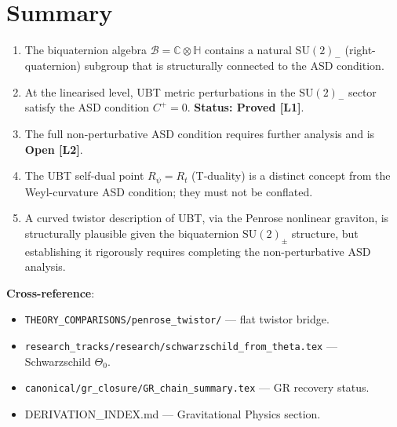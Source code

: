 \documentclass[11pt,a4paper]{article}
\theoremstyle{definition}
\theoremstyle{remark}
\begin{document}
\section{Summary}
\label{sec:summary}

\begin{tcolorbox}[colback=green!5!white,colframe=green!75!black,
                  title={Summary}]
\begin{enumerate}
  \item The biquaternion algebra $\mathcal{B} = \mathbb{C}\otimes\mathbb{H}$
        contains a natural $\mathrm{SU}(2)_-$ (right-quaternion) subgroup
        that is structurally connected to the ASD condition.

  \item At the linearised level, UBT metric perturbations in the
        $\mathrm{SU}(2)_-$ sector satisfy the ASD condition $C^+ = 0$.
        \textbf{Status: Proved [L1]}.

  \item The full non-perturbative ASD condition requires further analysis
        and is \textbf{Open [L2]}.

  \item The UBT self-dual point $R_\psi = R_t$ (T-duality) is a distinct
        concept from the Weyl-curvature ASD condition; they must not be
        conflated.

  \item A curved twistor description of UBT, via the Penrose nonlinear
        graviton, is structurally plausible given the biquaternion
        $\mathrm{SU}(2)_\pm$ structure, but establishing it rigorously
        requires completing the non-perturbative ASD analysis.
\end{enumerate}

\textbf{Cross-reference}:
\begin{itemize}
  \item \texttt{THEORY\_COMPARISONS/penrose\_twistor/} — flat twistor bridge.
  \item \texttt{research\_tracks/research/schwarzschild\_from\_theta.tex} —
        Schwarzschild $\Theta_0$.
  \item \texttt{canonical/gr\_closure/GR\_chain\_summary.tex} — GR recovery status.
  \item DERIVATION\_INDEX.md --- Gravitational Physics section.
\end{itemize}
\end{tcolorbox}
\end{document}
